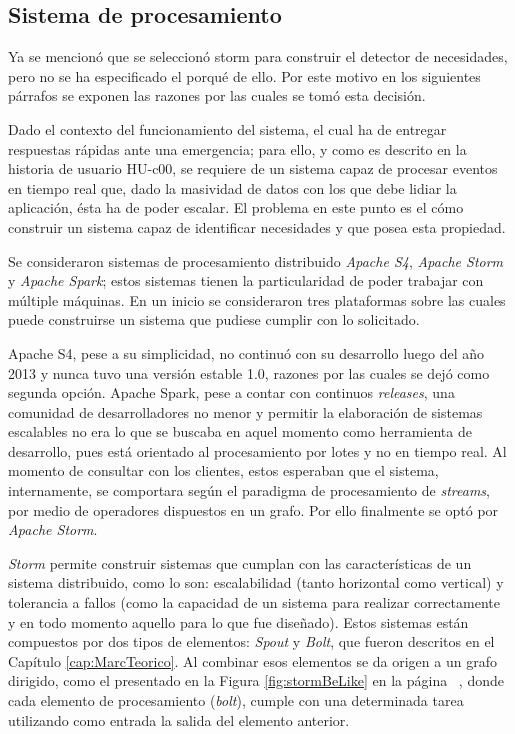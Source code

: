 \subsection{Sistema de procesamiento}
\label{sec:diseno:sistDeProce}

Ya se mencionó que se seleccionó storm para construir el detector de necesidades, pero no se ha especificado el porqué de ello. Por este motivo en los siguientes párrafos se exponen las razones por las cuales se tomó esta decisión.

Dado el contexto del funcionamiento del sistema, el cual ha de entregar respuestas rápidas ante una emergencia; para ello, y como es descrito en la historia de usuario HU-c00, se requiere de un sistema capaz de procesar eventos en tiempo real que, dado la masividad de datos con los que debe lidiar la aplicación, ésta ha de poder escalar. El problema en este punto es el cómo construir un sistema capaz de identificar necesidades y que posea esta propiedad.

Se consideraron sistemas de procesamiento distribuido \textit{Apache S4}, \textit{Apache Storm} y \textit{Apache Spark}; estos sistemas tienen la particularidad de poder trabajar con múltiple máquinas. En un inicio se consideraron tres plataformas sobre las cuales puede construirse un sistema que pudiese cumplir con lo solicitado.

Apache S4, pese a su simplicidad, no continuó con su desarrollo luego del año 2013 y nunca tuvo una versión estable 1.0, razones por las cuales se dejó como segunda opción. Apache Spark, pese a contar con continuos \textit{releases}, una comunidad de desarrolladores no menor y permitir la elaboración de sistemas escalables no era lo que se buscaba en aquel momento como herramienta de desarrollo, pues está orientado al procesamiento por lotes y no en tiempo real. Al momento de consultar con los clientes, estos esperaban que el sistema, internamente, se comportara según el paradigma de procesamiento de \textit{streams}, por medio de operadores dispuestos en un grafo. Por ello finalmente se optó por \textit{Apache Storm}.

\textit{Storm} permite construir sistemas que cumplan con las características de un sistema distribuido, como lo son: escalabilidad (tanto horizontal como vertical) y tolerancia a fallos (como la capacidad de un sistema para realizar correctamente y en todo momento aquello para lo que fue diseñado). Estos sistemas están compuestos por dos tipos de elementos: \textit{Spout} y \textit{Bolt}, que fueron descritos en el Capítulo \ref{cap:MarcTeorico}. Al combinar esos elementos se da origen a un grafo dirigido, como el presentado en la Figura \ref{fig:stormBeLike} en la página ~\pageref{fig:stormBeLike}, donde cada elemento de procesamiento (\textit{bolt}), cumple con una determinada tarea utilizando como entrada la salida del elemento anterior.

